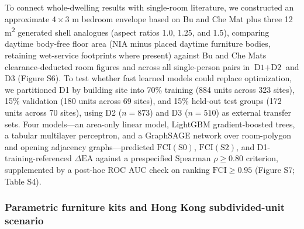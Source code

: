 \documentclass[12pt,letterpaper]{article}
\newcommand{\SubmissionCite}[1]{\unskip\citep{#1}}
\begin{document}
To connect whole-dwelling results with single-room literature, we constructed an approximate \(4 \times 3\text{ m}\) bedroom envelope based on Bu and Che Mat \SubmissionCite{bu2026compact} plus three 12 m\textsuperscript{2} generated shell analogues (aspect ratios 1.0, 1.25, and 1.5), comparing daytime body-free floor area (\(\text{NIA}\) minus placed daytime furniture bodies, retaining wet-service footprints where present) against Bu and Che Mat\textquotesingle s clearance-deducted room figures and across all single-person pairs in \(\text{D1}+\text{D2}\) and D3 (Figure S6). To test whether fast learned models could replace optimization, we partitioned D1 by building site into 70\% training (884 units across 323 sites), 15\% validation (180 units across 69 sites), and 15\% held-out test groups (172 units across 70 sites), using D2 (\(n = 873\)) and D3 (\(n = 510\)) as external transfer sets. Four models---an area-only linear model, LightGBM gradient-boosted trees, a tabular multilayer perceptron, and a GraphSAGE network over room-polygon and opening adjacency graphs---predicted \(\text{FCI}(\text{S0})\), \(\text{FCI}(\text{S2})\), and D1-training-referenced \(\Delta\text{EA}\) against a prespecified \(\text{Spearman } \rho \ge 0.80\) criterion, supplemented by a post-hoc ROC AUC check on ranking \(\text{FCI} \ge 0.95\) (Figure S7; Table S4).

\subsubsection{Parametric furniture kits and Hong Kong subdivided-unit scenario}\label{parametric-furniture-kits-and-hong-kong-subdivided-unit-scenario}
\end{document}
